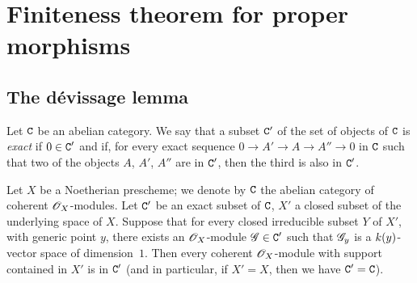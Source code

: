 \section{Finiteness theorem for proper morphisms}
\label{section:3.3}

\subsection{The d\'evissage lemma}
\label{subsection:3.3.1}

\begin{definition}[3.1.1]
\label{3.3.1.1}
Let $\mathtt{C}$ be an abelian category.
We say that a subset $\mathtt{C}'$ of the set of objects of $\mathtt{C}$ is \emph{exact} if $0\in\mathtt{C}'$ and if, for every exact sequence $0\to A'\to A\to A''\to 0$ in $\mathtt{C}$ such that two of the objects $A$, $A'$, $A''$ are in $\mathtt{C}'$, then the third is also in $\mathtt{C}'$.
\end{definition}

\begin{theorem}[3.1.2]
\label{3.3.1.2}
Let $X$ be a Noetherian prescheme; we denote by $\mathtt{C}$ the abelian category of coherent $\mathscr{O}_X$-modules.
Let $\mathtt{C}'$ be an exact subset of $\mathtt{C}$, $X'$ a closed subset of the underlying space of $X$.
Suppose that for every closed irreducible subset $Y$ of $X'$, with generic point $y$, there exists an $\mathscr{O}_X$-module $\mathscr{G}\in\mathtt{C}'$ such that $\mathscr{G}_y$ is a $k(y)$-vector space of dimension~$1$.
Then every coherent $\mathscr{O}_X$-module with support contained in $X'$ is in $\mathtt{C}'$ (and in particular, if $X'=X$, then we have $\mathtt{C}'=\mathtt{C}$).
\end{theorem}

